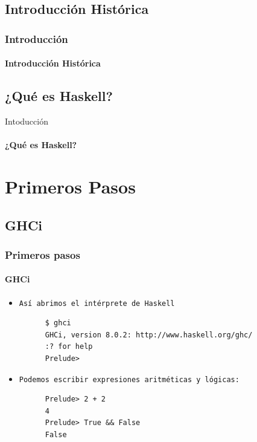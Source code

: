 \documentclass{beamer}
\begin{document}
\subsection{Introducción Histórica}
\begin{frame}[fragile]          %
  \frametitle{Introducción}
  \framesubtitle{Introducción Histórica}

\end{frame}

\subsection{¿Qué es Haskell?}
\begin{frame}{Intoducción}      %
  \framesubtitle{¿Qué es Haskell?}

\end{frame}

\section{Primeros Pasos}
\subsection{GHCi}
\begin{frame}[fragile]
  \frametitle{Primeros pasos}
  \framesubtitle{GHCi}
  \begin{itemize}
  \item\texttt{Así abrimos el intérprete de Haskell}
\begin{verbatim}
      $ ghci
      GHCi, version 8.0.2: http://www.haskell.org/ghc/
      :? for help
      Prelude>
\end{verbatim}

  \item\texttt{Podemos escribir expresiones aritméticas y lógicas:}
    \begin{verbatim}
      Prelude> 2 + 2
      4
      Prelude> True && False
      False
    \end{verbatim}
  \end{itemize}
\end{frame}
\end{document}
